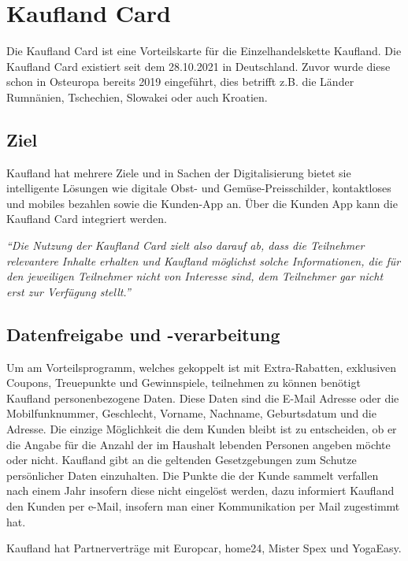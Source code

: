 \section{Kaufland Card}
Die Kaufland Card ist eine Vorteilskarte für die Einzelhandelskette Kaufland. Die Kaufland Card existiert seit dem 28.10.2021 in Deutschland. Zuvor wurde diese schon in Osteuropa bereits 2019 eingeführt, dies betrifft z.B. die Länder Rumnänien, Tschechien, Slowakei oder auch Kroatien. 

\subsection{Ziel}
Kaufland hat mehrere Ziele und in Sachen der Digitalisierung bietet sie intelligente Lösungen wie digitale Obst- und Gemüse-Preisschilder, kontaktloses und mobiles bezahlen sowie die Kunden-App an. Über die Kunden App kann die Kaufland Card integriert werden. \cite{Kaufland_Ziele} \newline

\noindent \textit{``Die Nutzung der Kaufland Card zielt also darauf ab, dass die Teilnehmer relevantere Inhalte erhalten und Kaufland möglichst solche Informationen, die für den jeweiligen Teilnehmer nicht von Interesse sind, dem Teilnehmer gar nicht erst zur Verfügung stellt.'' \cite{Kaufland_Datenschutz}}

\subsection{Datenfreigabe und -verarbeitung}
Um am Vorteilsprogramm, welches gekoppelt ist mit Extra-Rabatten, exklusiven Coupons, Treuepunkte und Gewinnspiele, teilnehmen zu können benötigt Kaufland personenbezogene Daten. Diese Daten sind  die E-Mail Adresse oder die Mobilfunknummer, Geschlecht, Vorname, Nachname, Geburtsdatum und die Adresse. Die einzige Möglichkeit die dem Kunden bleibt ist zu entscheiden, ob er die Angabe für die Anzahl der im Haushalt lebenden Personen angeben möchte oder nicht. Kaufland gibt an die geltenden Gesetzgebungen zum Schutze persönlicher Daten einzuhalten. Die Punkte die der Kunde sammelt verfallen nach einem Jahr insofern diese nicht eingelöst werden, dazu informiert Kaufland den Kunden per e-Mail, insofern man einer Kommunikation per Mail zugestimmt hat. \newline

\noindent Kaufland hat Partnerverträge mit Europcar, home24, Mister Spex und YogaEasy. \cite{Kaufland_FAQ} \newline

